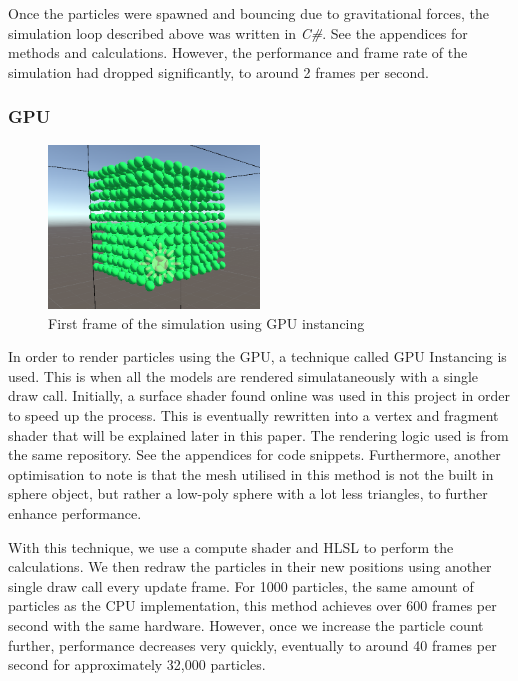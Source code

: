 \documentclass[12pt]{article}
\begin{document}
    Once the particles were spawned and bouncing due to gravitational forces, the simulation loop described above was written in \textit{C\#}. See the appendices for methods and calculations. However, the performance and frame rate of the simulation had dropped significantly, to around 2 frames per second.

    \subsubsection{GPU}

    \begin{figure}[H]
        \begin{center}
            \includegraphics[width=0.5\textwidth]{firstFrameGPU.png}
            \caption{First frame of the simulation using GPU instancing}
        \end{center}
    \end{figure}

    In order to render particles using the GPU, a technique called GPU Instancing is used. This is when all the models are rendered simulataneously with a single draw call. Initially, a surface shader found online was used in this project in order to speed up the process\cite{gpuinstanceshader}. This is eventually rewritten into a vertex and fragment shader that will be explained later in this paper. The rendering logic used is from the same repository. See the appendices for code snippets. Furthermore, another optimisation to note is that the mesh utilised in this method is not the built in sphere object, but rather a low-poly sphere with a lot less triangles, to further enhance performance.

    With this technique, we use a compute shader and HLSL to perform the calculations. We then redraw the particles in their new positions using another single draw call every update frame. For 1000 particles, the same amount of particles as the CPU implementation, this method achieves over 600 frames per second with the same hardware. However, once we increase the particle count further, performance decreases very quickly, eventually to around 40 frames per second for approximately 32,000 particles.
\end{document}

